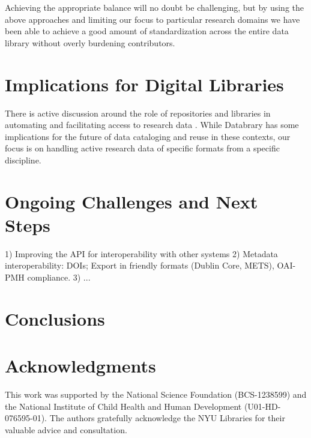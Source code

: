 \documentclass{sig-alternate}
\begin{document}
Achieving the appropriate balance will no doubt be challenging, but by using the above approaches and limiting our focus to particular research domains we have been able to achieve a good amount of standardization across the entire data library without overly burdening contributors.

\section{Implications for Digital Libraries}

There is active discussion around the role of repositories and libraries in automating and facilitating access to research data \cite{Castelli_etal_2013, Nielson_Hjørland_2014, Macmillan_2014}.
While Databrary has some implications for the future of data cataloging and reuse in these contexts, our focus is on handling active research data of specific formats from a specific discipline.

\section{Ongoing Challenges and Next Steps}
  
 1) Improving the API for interoperability with other systems
 2) Metadata interoperability: DOIs; Export in friendly formats (Dublin Core, METS), OAI-PMH compliance.
 3) ...

\section{Conclusions}

\section*{Acknowledgments}

This work was supported by the National Science Foundation (BCS-1238599) and the National Institute of Child Health and Human Development (U01-HD-076595-01).
The authors gratefully acknowledge the NYU Libraries for their valuable advice and consultation.



\end{document}
